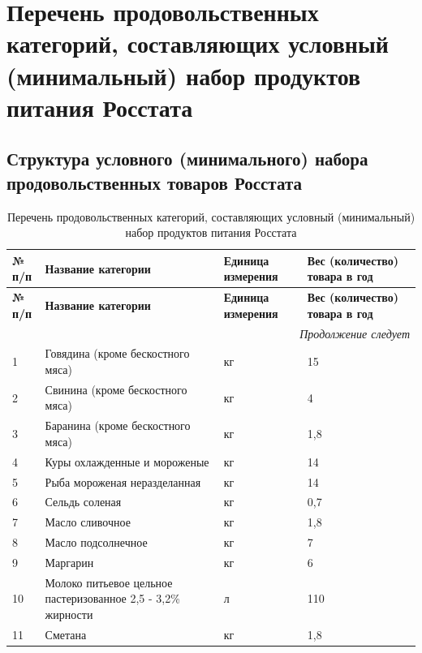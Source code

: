 \chapter{Перечень продовольственных категорий, составляющих условный (минимальный) набор продуктов питания Росстата}\label{app:A}

\section{Структура условного (минимального) набора продовольственных товаров Росстата}\label{app:A1}

\begin{longtable}{|p{1.8cm}|p{6cm}|p{4cm}|p{4cm}|} %
	\caption{Перечень продовольственных категорий, составляющих условный (минимальный) набор продуктов питания Росстата} 
	\label{tab:food_categories} \\
	\toprule
	\textbf{№ п/п} & \textbf{Название категории} & \textbf{Единица измерения} & \textbf{Вес (количество) товара в год} \\
	\midrule
	\endfirsthead
	
	\toprule
	\textbf{№ п/п} & \textbf{Название категории} & \textbf{Единица измерения} & \textbf{Вес (количество) товара в год} \\
	\midrule
	\endhead
	
	\hline
	\multicolumn{4}{|r|}{\small \slshape Продолжение следует} \\ 
	\hline
	\endfoot
	
	\endlastfoot
	
	\footnotesize
	1   & Говядина (кроме бескостного мяса) & кг & 15 \\
	2   & Свинина (кроме бескостного мяса) & кг & 4 \\
	3   & Баранина (кроме бескостного мяса) & кг & 1,8 \\
	4   & Куры охлажденные и мороженые & кг & 14 \\
	5   & Рыба мороженая неразделанная & кг & 14 \\
	6   & Сельдь соленая & кг & 0,7 \\
	7   & Масло сливочное & кг & 1,8 \\
	8   & Масло подсолнечное & кг & 7 \\
	9   & Маргарин & кг & 6 \\
	10  & Молоко питьевое цельное пастеризованное 2,5 - 3,2\% жирности & л & 110 \\
	11  & Сметана & кг & 1,8 \\
	
	\end{longtable}
	
